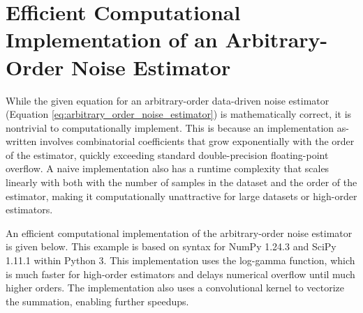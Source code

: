 \section{Efficient Computational Implementation of an Arbitrary-Order Noise Estimator}
\label{sec:estimator_code_example}

While the given equation for an arbitrary-order data-driven noise estimator (Equation \ref{eq:arbitrary_order_noise_estimator}) is mathematically correct, it is nontrivial to computationally implement. This is because an implementation as-written involves combinatorial coefficients that grow exponentially with the order of the estimator, quickly exceeding standard double-precision floating-point overflow. A naive implementation also has a runtime complexity that scales linearly with both with the number of samples in the dataset and the order of the estimator, making it computationally unattractive for large datasets or high-order estimators.

An efficient computational implementation of the arbitrary-order noise estimator is given below. This example is based on syntax for NumPy 1.24.3 and SciPy 1.11.1 within Python 3. This implementation uses the log-gamma function, which is much faster for high-order estimators and delays numerical overflow until much higher orders. The implementation also uses a convolutional kernel to vectorize the summation, enabling further speedups.

